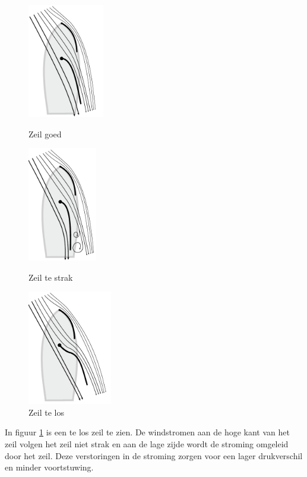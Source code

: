\begin{figure}[H]
  \centering
  \begin{minipage}[b]{0.32\textwidth}
  \centering
    \includegraphics[height=5cm]{Hoofdstukken/Krachten/pdf/trimmen_goed.pdf}
    \caption{Zeil goed}
    \label{pic:zeil_goed}
  \end{minipage}
  \hfill
  \begin{minipage}[b]{0.32\textwidth}
    \centering
    \includegraphics[height=5cm]{Hoofdstukken/Krachten/pdf/trimmen_strak.pdf}
    \caption{Zeil te strak}
    \label{pic:zeil_strak}
    \end{minipage}
  \hfill
  \begin{minipage}[b]{0.32\textwidth}
    \centering
    \includegraphics[height=5cm]{Hoofdstukken/Krachten/pdf/trimmen_los.pdf}
    \caption{Zeil te los}
    \label{pic:zeil_los}
  \end{minipage}
\end{figure}

In figuur \ref{pic:zeil_los} is een te los zeil te zien. De windstromen aan de hoge kant van het zeil volgen het zeil niet strak en aan de lage zijde wordt de stroming omgeleid door het zeil. Deze verstoringen in de stroming zorgen voor een lager drukverschil en minder voortstuwing. 

